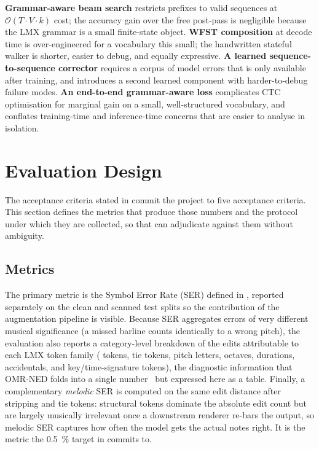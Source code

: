 \textbf{Grammar-aware beam search} restricts prefixes to valid sequences at $\mathcal{O}(T\cdot V\cdot k)$ cost; the accuracy gain over the free post-pass is negligible because the LMX grammar is a small finite-state object.
\textbf{WFST composition} at decode time is over-engineered for a vocabulary this small; the handwritten stateful walker is shorter, easier to debug, and equally expressive.
\textbf{A learned sequence-to-sequence corrector} requires a corpus of model errors that is only available after training, and introduces a second learned component with harder-to-debug failure modes.
\textbf{An end-to-end grammar-aware loss} complicates CTC optimisation for marginal gain on a small, well-structured vocabulary, and conflates training-time and inference-time concerns that are easier to analyse in isolation.

\section{Evaluation Design}
\label{sec:design-eval}

The acceptance criteria stated in  commit the
project to five acceptance criteria. This section defines the metrics
that produce those numbers and the protocol under which they are
collected, so that  can adjudicate against them
without ambiguity.

\subsection{Metrics}

The primary metric is the Symbol Error Rate (SER) defined in
, reported separately on the clean and scanned
test splits so the contribution of the augmentation pipeline is
visible. Because SER aggregates errors of very different musical
significance (a missed barline counts identically to a wrong pitch),
the evaluation also reports a category-level breakdown of the
edits attributable to each LMX token family ( tokens,
tie tokens, pitch letters, octaves, durations, accidentals, and
key/time-signature tokens), the diagnostic information that OMR-NED
folds into a single number~\cite{martinezSevillaOMRNED2025} but
expressed here as a table. Finally, a complementary \textit{melodic}
SER is computed on the same edit distance after stripping
 and tie tokens: structural tokens dominate the absolute
edit count but are largely musically irrelevant once a downstream
renderer re-bars the output, so melodic SER captures how often the
model gets the actual notes right. It is the metric the
\SI{0.5}{\percent} target in  commits to.

